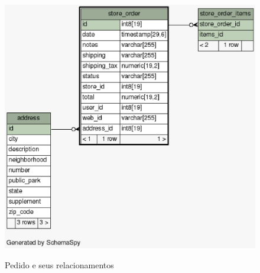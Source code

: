 \documentclass[a4paper,12pt]{monografia}
\begin{document}
\begin{figure}[H]
\centering
\caption{Pedido e seus relacionamentos}
\centering
\includegraphics[scale=0.7]{img/diagramas/schema/store_order.1degree.png.eps}\\
\end{figure}
\end{document}
